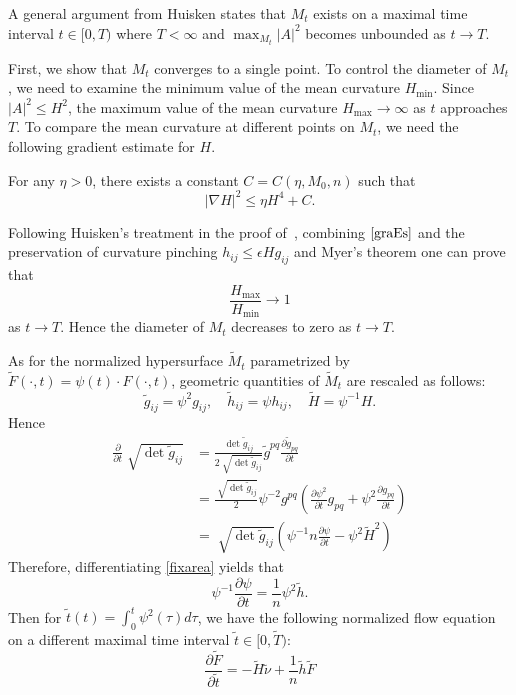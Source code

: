 A general argument from Huisken \cite[Theorem 8.1]{huisken_flow_1984} states that $M_t$ exists on a maximal time interval $t \in [0,T)$ where $T<\infty $ and $\max_{M_t}\left| A \right| ^2 $ becomes unbounded as $t \to T$.

First, we show that $M_t$ converges to a single point. To control the diameter of $M_t$, we need to examine the minimum value of the mean curvature $H_{\min }$. Since $\left| A \right| ^2 \leq H^2$, the maximum value of the mean curvature $H_{\max } \to \infty$ as $t$ approaches $T$. To compare the mean curvature at different points on $M_t$, we need the following gradient estimate for $H$.
\begin{theorem} \label{graEs}
	For any $\eta >0$, there exists a constant $C=C(\eta ,M_0,n)$ such that 
	\[\left| \nabla H \right| ^2 \leq \eta H^4 + C.\]
\end{theorem}
Following Huisken's treatment in the proof of~\cite[Theorem 8.4]{huisken_flow_1984}, combining $\autoref{graEs}$ and the preservation of curvature pinching $h_{ij }^{} \leq \epsilon H g_{ij }^{} $ and Myer's theorem one can prove that \[\frac{H_{\max }}{H_{\min }} \to 1\] as $t \to T$. Hence the diameter of $M_t$ decreases to zero as $t \to T.$ 

As for the normalized hypersurface $\tilde{M}_t$ parametrized by $\tilde{F}(\cdot ,t)=\psi (t) \cdot F(\cdot ,t)$, geometric quantities of $\tilde{M}_t$ are rescaled as follows:
\[\tilde{g }_{ij }^{}=\psi ^2 g_{ij }^{}, \quad  \tilde{h}_{ij}=\psi h_{ij }^{} , \quad  \tilde{H}=\psi ^{-1} H. \]
Hence
\begin{equation*}
\begin{split}
	\frac{\partial }{\partial t} \sqrt[]{\det \tilde{g}_{ij }^{} } 
&=  \frac{\det \tilde{g}_{ij }^{}}{2 \sqrt[]{\det \tilde{g}_{ij }^{}}} \tilde{g}_{ }^{pq} \frac{\partial \tilde{g}_{pq }^{} }{\partial t}  \\
&= \frac{\sqrt[]{\det \tilde{g}_{ij }^{} }}{2}\psi ^{-2}g_{ }^{pq} \left( \frac{\partial \psi^2 }{\partial t} g_{ pq}^{}  + \psi^2 \frac{\partial g_{ pq}^{} }{\partial t}  \right) \\
&= \sqrt[]{\det \tilde{g}_{ij }^{} }\left(\psi ^{-1}n  \frac{\partial \psi }{\partial t}   - \psi ^2 \tilde{H}^2  \right)
\end{split}
\end{equation*}
Therefore, differentiating \autoref{fixarea} yields that
\[\psi ^{-1}  \frac{\partial \psi }{\partial t}   = \frac{1}{n}\psi ^2 \tilde{h}.\]
Then for $\tilde{t}(t)=\int_{0}^{t}\psi ^2(\tau )d \tau $, we have the following normalized flow equation on a different maximal time interval $\tilde{t} \in [0,\tilde{T})$:
\begin{equation*}
	\frac{\partial \tilde{F}}{\partial \tilde{t}}=-\tilde{H}\tilde{\nu }+ \frac{1}{n}\tilde{h}\tilde{F}
\end{equation*}

